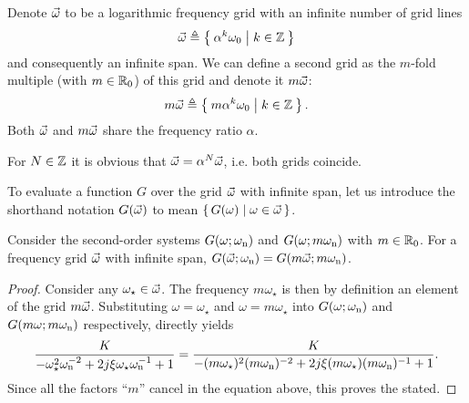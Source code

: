   Denote $\vec{\omega}$ to be a logarithmic frequency grid with an infinite number of grid lines
  \begin{equation}
    \vec{\omega} \triangleq \Set{\alpha^k \omega_0 | k \in \ensuremath{\mathbb{Z}}}
    \label{eq:excitation:freqGridLog}
  \end{equation}
  and consequently an infinite span.
  We can define a second grid as the $m$-fold multiple (with $m \in {\ensuremath{\mathbb{R}}}_{0}$) of this grid and denote it $m\vec{\omega}$:
  \begin{equation}
    m \vec{\omega} \triangleq \Set{m \alpha^k \omega_0 | k \in \ensuremath{\mathbb{Z}}}
    \text{.}
  \end{equation}
  Both $\vec{\omega}$ and $m\vec{\omega}$ share the frequency ratio $\alpha$.
  \begin{remark} \label{rem:excitation:exc:gridscaling}
    For $N \in \mathbb{Z}$ it is obvious that $\vec{\omega} = \alpha^{N} \vec{\omega}$, i.e. both grids coincide.
  \end{remark}

  \begin{definition}
  To evaluate a function $G$ over the grid $\vec{\omega}$ with infinite span, let us introduce the shorthand notation $G(\vec{\omega})$ to mean $\set{G(\omega) | \omega \in \ensuremath{\vec{\omega}}}$.
  \end{definition}

  \begin{lemma} \label{lem:excitation:exc:sysscaling}
  Consider the second-order systems $G(\omega; \omega_{\mathrm{n}})$ and $G(\omega; m\omega_{\mathrm{n}})$ with $m \in {\ensuremath{\mathbb{R}}}_{0}$. 
  For a frequency grid $\vec{\omega}$ with infinite span, $G(\vec{\omega}; \omega_{\mathrm{n}}) = G(m \vec{\omega}; m\omega_{\mathrm{n}})$.
  \end{lemma}
  \begin{proof}
  Consider any $\omega_{\star} \in \vec{\omega}$. The frequency $m\omega_{\star}$ is then by definition an element of the grid $m\vec{\omega}$.
  Substituting $\omega = \omega_{\star}$ and $\omega = m \omega_{\star}$  into  $G(\omega; \omega_{\mathrm{n}})$ and $G(m\omega; m\omega_{\mathrm{n}})$  respectively, directly yields
  \begin{equation}
    \frac{K_{}}{- \omega_{\star}^2 \omega_{\mathrm{n}}^{-2} + 2j\xi_{} \omega_{\star} \omega_{\mathrm{n}}^{-1} + 1} = 
    \frac{K_{}}{- (m\omega_{\star})^2 (m\omega_{\mathrm{n}})^{-2} + 2j\xi_{} (m\omega_{\star}) (m\omega_{\mathrm{n}})^{-1} + 1}
    \text{.}
  \end{equation}
  Since all the factors ``$m$'' cancel in the equation above, this proves the stated.
  \end{proof}

